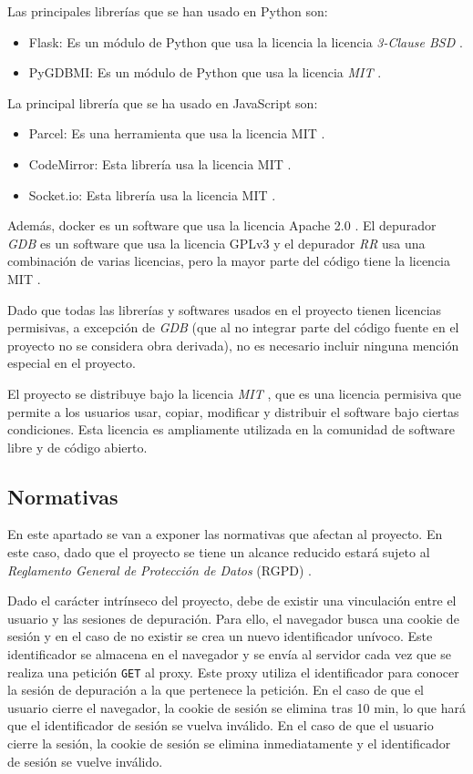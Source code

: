 Las principales librerías que se han usado en Python son:
\begin{itemize}
    \item Flask: Es un módulo de Python que usa la licencia la licencia \textit{3-Clause BSD} \cite{flask}.
    \item PyGDBMI: Es un módulo de Python que usa la licencia \textit{MIT} \cite{pygdbmi}.
\end{itemize}

La principal librería que se ha usado en JavaScript son:
\begin{itemize}
    \item Parcel: Es una herramienta que usa la licencia MIT \cite{parcel}.
    \item CodeMirror: Esta librería usa la licencia MIT \cite{codemirror}. 
    \item Socket.io: Esta librería usa la licencia MIT \cite{socket.io}.
\end{itemize}

Además, docker es un software que usa la licencia Apache 2.0 \cite{docker}. El depurador \textit{GDB} es un software que usa la licencia GPLv3 \cite{GDB} y el depurador \textit{RR} usa una combinación de varias licencias, pero la mayor parte del código tiene la licencia MIT \cite{RR-Github}.

Dado que todas las librerías y softwares usados en el proyecto tienen licencias permisivas, a excepción de \textit{GDB} (que al no integrar parte del código fuente en el proyecto no se considera obra derivada), no es necesario incluir ninguna mención especial en el proyecto.

El proyecto se distribuye bajo la licencia \textit{MIT} \cite{mit}, que es una licencia permisiva que permite a los usuarios usar, copiar, modificar y distribuir el software bajo ciertas condiciones. Esta licencia es ampliamente utilizada en la comunidad de software libre y de código abierto.

\subsection{Normativas}\label{subsec:normativas}

En este apartado se van a exponer las normativas que afectan al proyecto. En este caso, dado que el proyecto se tiene un alcance reducido estará sujeto al \textit{Reglamento General de Protección de Datos} (RGPD) \cite{rgpd}.

Dado el carácter intrínseco del proyecto, debe de existir una vinculación entre el usuario y las sesiones de depuración. Para ello, el navegador busca una cookie de sesión y en el caso de no existir se crea un nuevo identificador unívoco. Este identificador se almacena en el navegador y se envía al servidor cada vez que se realiza una petición \texttt{GET} al proxy. Este proxy utiliza el identificador para conocer la sesión de depuración a la que pertenece la petición. En el caso de que el usuario cierre el navegador, la cookie de sesión se elimina tras 10 min, lo que hará que el identificador de sesión se vuelva inválido. En el caso de que el usuario cierre la sesión, la cookie de sesión se elimina inmediatamente y el identificador de sesión se vuelve inválido.

